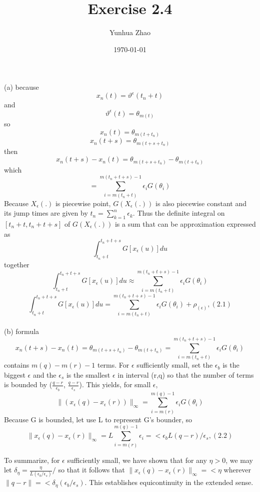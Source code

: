 \documentclass{article}
\title{Exercise 2.4}
\author{Yunhua Zhao}
\date{\today}
\begin{document}
\maketitle
(a) because $$x_{n}(t)=\vartheta^{\epsilon}(t_{n}+t)$$ and $$\vartheta^{\epsilon}(t)=\theta_{m(t)}$$ 
so $$x_{n}(t)=\theta_{m(t+t_n)}$$ 
   $$x_{n}(t+s)=\theta_{m(t+s+t_n)} $$
then $$x_{n}(t+s)-x_{n}(t)=\theta_{m(t+s+t_n)}-\theta_{m(t+t_n)}$$
which $$ =\sum_{i=m(t_n+t)}^{m(t_n+t+s)-1}\epsilon_iG(\theta_i) $$
Because $X_\epsilon(.)$ is piecewise point, $G(X_\epsilon(.))$ is also piecewise constant and its jump times are given by $t_n=\sum_{k=1}^{n}\epsilon_k$. Thus the definite integral on $[t_n+t, t_n+t+s]$ of $G(X_\epsilon(.))$ is a sum that can be approximation expressed as $$ \int_{t_n+t}^{t_n+t+s}G[x_\epsilon(u)]du $$ 
together  $$ \int_{t_n+t}^{t_n+t+s}G[x_\epsilon(u)]du  \approx \sum_{i=m(t_n+t)}^{m(t_n+t+s)-1}\epsilon_iG(\theta_i) $$ 
$$ \int_{t_n+t}^{t_n+t+s}G[x_\epsilon(u)]du=\sum_{i=m(t_n+t)}^{m(t_n+t+s)-1}\epsilon_iG(\theta_i)+\rho_(\epsilon),                    (2.1)$$ \\

(b) formula $$x_n(t+s)-x_n(t)=\theta_{m(t+s+t_n)}-\theta_{m(t+t_n)}=\sum_{i=m(t_n+t)}^{m(t_n+t+s)-1}\epsilon_iG(\theta_i) $$
contains $m(q)-m(r)-1$ terms. For $\epsilon$ sufficiently small, set the $\epsilon_b$ is the biggest $\epsilon$ and the $\epsilon_s$ is the smallest $\epsilon$ in interval (r,q) %
so that the number of terms is bounded by ($\frac{q-r}{\epsilon_b}$, $\frac{q-r}{\epsilon_s}$). This yields, for small $\epsilon$,
$$  \lVert(x_\epsilon(q)-x_\epsilon(r))\rVert_\infty = \sum_{i=m(r)}^{m(q)-1}\epsilon_iG(\theta_i) $$
Because G is bounded, let use L to represent G's bounder, so 
$$  \lVert x_\epsilon(q)-x_\epsilon(r) \rVert_\infty = L\sum_{i=m(r)}^{m(q)-1}\epsilon_i =<\epsilon_b L(q-r)/\epsilon_s,                               (2.2)$$

To summarize, for $\epsilon$ sufficiently small, we have shown that for any $\eta>0$, we may let $\delta_\eta=\frac{\eta}{L(\epsilon_b/\epsilon_s)}/$ so that it follows that $\lVert x_\epsilon(q)-x_\epsilon(r) \rVert_\infty =<\eta$ wherever $\lVert q-r \rVert =< \delta_\eta(\epsilon_b/\epsilon_s)$.  
This establishes equicontinuity in the extended sense.\\
\end{document}
